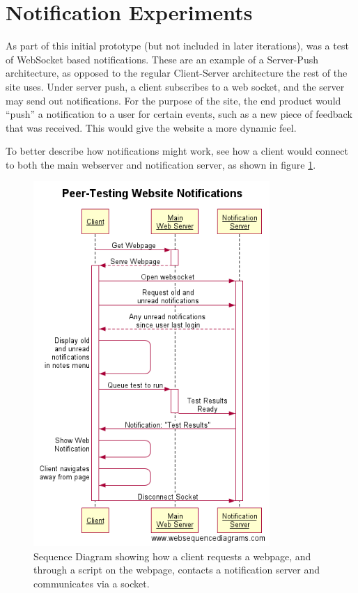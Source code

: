 \documentclass[a4paper,11pt]{report}
\begin{document}
\section{Notification Experiments}
As part of this initial prototype (but not included in later iterations), was a test of WebSocket based notifications. These are an example of a Server-Push architecture, as opposed to the regular Client-Server architecture the rest of the site uses. Under server push, a client subscribes to a web socket, and the server may send out notifications. For the purpose of the site, the end product would ``push'' a notification to a user for certain events, such as a new piece of feedback that was received. This would give the website a more dynamic feel.\par
To better describe how notifications might work, see how a client would connect to both the main webserver and notification server, as shown in figure \ref{fig:seq-note}.
\begin{figure}[ht]
\includegraphics[width=0.8\textwidth]{fig/seq-note.png}
\caption{Sequence Diagram showing how a client requests a webpage, and through a script on the webpage, contacts a notification server and communicates via a socket.}
\label{fig:seq-note}
\end{figure}
\end{document}
